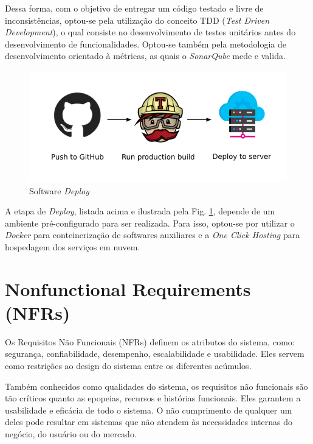 Dessa forma, com o objetivo de entregar um código testado e livre de inconsistências, optou-se pela utilização do conceito TDD (\emph{Test Driven Development}), o qual consiste no desenvolvimento de testes unitários antes do desenvolvimento de funcionalidades. Optou-se também pela metodologia de desenvolvimento orientado à métricas, as quais o \textit{SonarQube} mede e valida.

\begin{figure}[H]
    \centering
    \includegraphics[width=1.0\textwidth]{figuras/software/deploy-continuous.png}
    \caption{Software \textit{Deploy}}
    \label{fig:software_deploy}
\end{figure}

A etapa de \emph{Deploy}, listada acima e ilustrada pela Fig. \ref{fig:software_deploy}, depende de um ambiente pré-configurado para ser realizada. Para isso, optou-se por utilizar o \textit{Docker} para conteinerização de softwares auxiliares e a \textit{One Click Hosting} para hospedagem dos serviços em nuvem.

\section{Nonfunctional Requirements (NFRs) }

Os Requisitos Não Funcionais (NFRs) definem os atributos do sistema, como: segurança, confiabilidade, desempenho, escalabilidade e usabilidade. Eles servem como restrições ao design do sistema entre os diferentes acúmulos.

Também conhecidos como qualidades do sistema, os requisitos não funcionais são tão críticos quanto as epopeias, recursos e histórias funcionais. Eles garantem a usabilidade e eficácia de todo o sistema. O não cumprimento de qualquer um deles pode resultar em sistemas que não atendem às necessidades internas do negócio, do usuário ou do mercado.

